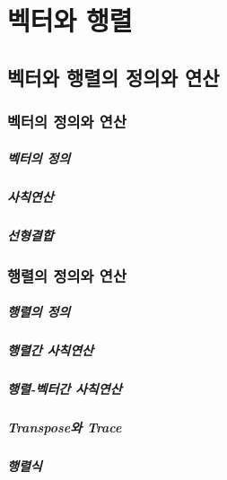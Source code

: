 
\chapter{벡터와 행렬}

\section{벡터와 행렬의 정의와 연산} 

\subsection{벡터의 정의와 연산} 

\paragraph{벡터의 정의}

\paragraph{사칙연산} 

\paragraph{선형결합}


\subsection{행렬의 정의와 연산}

\paragraph{행렬의 정의} 

\paragraph{행렬간 사칙연산} 

\paragraph{행렬-벡터간 사칙연산}

\paragraph{Transpose와 Trace}

\paragraph{행렬식}

